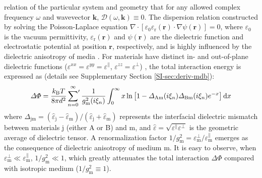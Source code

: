 relation of the particular system and geometry that for any allowed
complex frequency \(\omega\) and wavevector \(\mathbf{k}\),
\(\mathcal{D}(\omega, \mathbf{k}) \equiv 0\). The dispersion relation
constructed by solving the Poisson-Laplace equation \(\nabla \cdot
[\varepsilon_{0} \varepsilon_{\mathrm{r}}(\mathbf{r}) \cdot \nabla
\psi(\mathbf{r})] = 0\), where \(\varepsilon_{0}\) is the vacuum
permittivity, \(\varepsilon_{\mathrm{r}}(\mathbf{r})\) and
\(\psi(\mathbf{r})\) are the dielectric function and electrostatic
potential at position \(\mathbf{r}\), respectively, and is highly
influenced by the dielectric anisotropy of media \cite{Lu_2016_torque}.
For materials have distinct in- and out-of-plane dielectric functions
(\(\varepsilon^{xx} = \varepsilon^{yy} = \varepsilon^{\parallel}\),
\(\varepsilon^{zz} = \varepsilon^{\perp}\)) , the total interaction
energy is expressed as (details see Supplementary Section
\ref{SI-sec:deriv-mdb}):
\begin{equation}
\label{eq:Phi-aniso}
\Delta \Phi = \frac{k_{\mathrm{B}} T}{8 \pi d^{2}} 
\sideset{}{'} \sum_{n = 0}^{\infty} \frac{1}{g_{\mathrm{m}}^{2}(i \xi_{n})}
\int_{0}^{\infty} x \ln\left[1 - \Delta_{\mathrm{Am}}(i \xi_{n}) \Delta_{\mathrm{Bm}}(i \xi_{n}) e^{-x}\right] \mathrm{d} x 
\end{equation}
where \(\Delta_{\mathrm{jm}} = (\hat{\varepsilon}_{\mathrm{j}} -
\hat{\varepsilon}_{\mathrm{m}}) / (\hat{\varepsilon}_{\mathrm{j}} +
\hat{\varepsilon}_{\mathrm{m}})\) represents the interfacial dielectric
mismatch between materials j (either A or B) and m, and
\(\hat{\varepsilon} = \sqrt{\varepsilon^{\parallel}
\varepsilon^{\perp}}\) is the geometric average of dielectric tensor. A
renormalization factor \(1/g_{\mathrm{m}}^{2} =
\varepsilon^{\perp}_{\mathrm{m}} /
\varepsilon^{\parallel}_{\mathrm{m}}\) emerges as the consequence of
dielectric anisotropy of medium m. It is easy to observe, when
\(\varepsilon^{\perp}_{\mathrm{m}} \ll
\varepsilon^{\parallel}_{\mathrm{m}}\), \(1/g_{\mathrm{m}}^{2} \ll 1\),
which greatly attenuates the total interaction \(\Delta \Phi\) compared
with isotropic medium (\(1/g_{\mathrm{m}}^{2} \equiv 1\)). 



